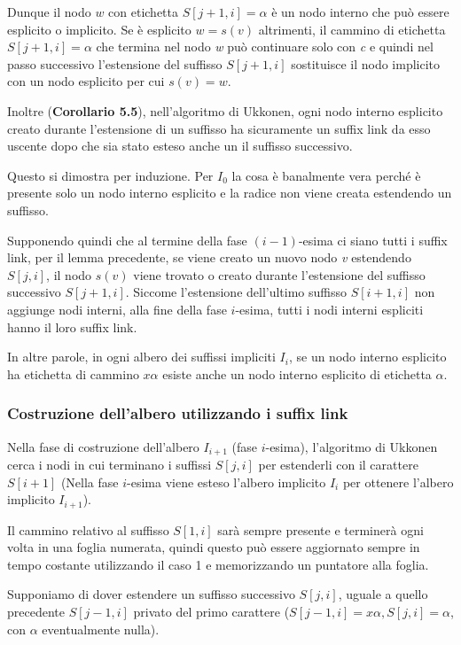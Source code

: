 Dunque il nodo $ w $ con etichetta $ S[j+1, i]  = \alpha$ è un nodo interno che può essere esplicito o implicito. Se è esplicito $w = s(v)$ altrimenti, il cammino di etichetta $ S[j+1, i] = \alpha $ che termina nel nodo \textit{w} può continuare solo con \textit{c} e quindi nel passo successivo l'estensione del suffisso $ S[j+1,i] $ sostituisce il nodo implicito con un nodo esplicito per cui $s(v) = w$.

Inoltre (\textbf{Corollario 5.5}), nell'algoritmo di Ukkonen, ogni nodo interno esplicito creato durante l'estensione di un suffisso ha sicuramente un suffix link da esso uscente dopo che sia stato esteso anche un il suffisso successivo.

Questo si dimostra per induzione. Per $ I_0 $ la cosa è banalmente vera perché è presente solo un nodo interno esplicito e la radice non viene creata estendendo un suffisso.

Supponendo quindi che al termine della fase $(i-1)$-esima ci siano tutti i suffix link, per il lemma precedente, se viene creato un nuovo nodo \textit{v} estendendo $ S[j,i] $, il nodo $ s(v) $ viene trovato o creato durante l'estensione del suffisso successivo $ S[j+1,i] $. Siccome l'estensione dell'ultimo suffisso $ S[i+1,i] $ non aggiunge nodi interni, alla fine della fase $ i $-esima, tutti i nodi interni espliciti hanno il loro suffix link.

In altre parole, in ogni albero dei suffissi impliciti $ I_i $, se un nodo interno esplicito ha etichetta di cammino $ x\alpha $ esiste anche un nodo interno esplicito di etichetta $\alpha$.

\subsubsection{Costruzione dell'albero utilizzando i suffix link}

Nella fase di costruzione dell'albero $ I_{i+1} $ (fase $ i $-esima), l'algoritmo di Ukkonen cerca i nodi in cui terminano i suffissi $ S[j,i] $ per estenderli con il carattere $ S[i+1] $ (Nella fase $i$-esima viene esteso l'albero implicito $I_i$ per ottenere l'albero implicito $I_{i+1}$).

Il cammino relativo al suffisso $ S[1,i] $ sarà sempre presente e terminerà ogni volta in una foglia numerata, quindi questo può essere aggiornato sempre in tempo costante utilizzando il caso 1 e memorizzando un puntatore alla foglia.

Supponiamo di dover estendere un suffisso successivo $ S[j,i] $, uguale a quello precedente $ S[j-1,i] $ privato del primo carattere ($S[j-1,i] = x\alpha, S[j,i]= \alpha$, con $\alpha$ eventualmente nulla).

